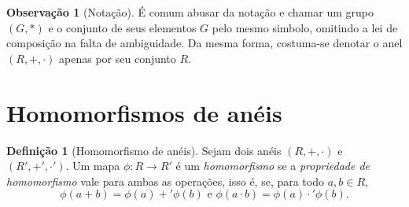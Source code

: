 \documentclass[a4paper,12pt]{article}
\theoremstyle{plain}
\theoremstyle{definition}
\newtheorem{definicao}{Definição}[section]
\newtheorem{observacao}{Observação}[section]
\begin{document}
	\begin{observacao}[Notação]
		É comum abusar da notação e chamar um grupo $(G,*)$ e o conjunto de	seus elementos $G$ pelo mesmo simbolo, omitindo a lei de composição na falta de ambiguidade. Da mesma forma, costuma-se denotar o anel $(R, +, \cdot)$ apenas por seu conjunto $R$.
	\end{observacao}
	
	\section{Homomorfismos de anéis}
	
	\begin{definicao}[Homomorfismo de anéis]
		Sejam dois anéis $(R, +, \cdot)$ e $(R', +', \cdot')$. Um mapa $\phi: R \longrightarrow R'$ é um \emph{homomorfismo} se a \emph{propriedade de homomorfismo} vale para ambas as operações, isso é, se, para todo $a,b\in R$,
				$$\phi(a+b) = \phi(a) +' \phi(b) \text{ e } \phi(a\cdot b) = \phi(a) \cdot' \phi(b).$$
	\end{definicao}
	
	
	
	
	
	
\end{document}
